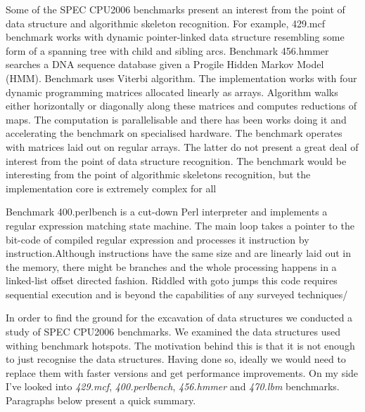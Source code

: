\documentclass[10pt,a4paper]{report}
\begin{document}
\begin{description}[style=nextline]
\item [Research interest] Some of the SPEC CPU2006 benchmarks present an interest from the point of data structure and algorithmic skeleton recognition. For example, 429.mcf benchmark works with dynamic pointer-linked data structure resembling some form of a spanning tree with child and sibling arcs.  Benchmark 456.hmmer searches a DNA sequence database given a Progile Hidden Markov Model (HMM). Benchmark uses Viterbi algorithm. The implementation works with four dynamic programming matrices allocated linearly as arrays. Algorithm walks either horizontally or diagonally along these matrices and computes reductions of maps. The computation is parallelisable and there has been works doing it \cite{Ganesan:2010:AHG:1854776.1854844}\cite{inria} and accelerating the benchmark on specialised hardware. The benchmark operates with matrices laid out on regular arrays. The latter do not present a great deal of interest from the point of data structure recognition. The benchmark would be interesting from the point of algorithmic skeletons recognition, but the implementation core is extremely complex for all 

Benchmark 400.perlbench is a cut-down Perl interpreter and implements a regular expression matching state machine. The main loop takes a pointer to the bit-code of compiled regular expression and processes it instruction by instruction.Although instructions have the same size and are linearly laid out in the memory, there might be branches and the whole processing happens in a linked-list offset directed fashion. Riddled with goto jumps this code requires sequential execution and is beyond the capabilities of any surveyed techniques/

\end{description}




\quad In order to find the ground for the excavation of data structures we conducted a study of SPEC CPU2006 benchmarks. We examined the data structures used withing benchmark hotspots. The motivation behind this is that it is not enough to just recognise the data structures. Having done so, ideally we would need to replace them with faster versions and get performance improvements. On my side I've looked into \textit{429.mcf}, \textit{400.perlbench}, \textit{456.hmmer} and \textit{470.lbm} benchmarks. Paragraphs below present a quick summary.
\end{document}
